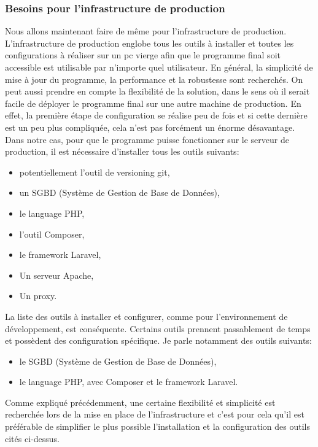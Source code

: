 \documentclass[
    iai, %
    il, %
]{heig-tb}
\begin{document}
\subsubsection{Besoins pour l'infrastructure de production}
Nous allons maintenant faire de même pour l'infrastructure de production.\newline
L'infrastructure de production englobe tous les outils à installer et toutes les configurations à réaliser sur un pc vierge afin que le programme final soit accessible est utilisable par n'importe quel utilisateur.\newline
En général, la simplicité de mise à jour du programme, la performance et la robustesse sont recherchés.\newline
On peut aussi prendre en compte la flexibilité de la solution, dans le sens où il serait facile de déployer le programme final sur une autre machine de production.\newline
En effet, la première étape de configuration se réalise peu de fois et si cette dernière est un peu plus compliquée, cela n'est pas forcément un énorme désavantage.\newline
Dans notre cas, pour que le programme puisse fonctionner sur le serveur de production, il est nécessaire d'installer tous les outils suivants:
\begin{itemize}
    \item potentiellement l'outil de versioning git,
    \item un SGBD (Système de Gestion de Base de Données),
    \item le language PHP,
    \item l'outil Composer,
    \item le framework Laravel,
    \item Un serveur Apache,
    \item Un proxy.
\end{itemize}
La liste des outils à installer et configurer, comme pour l'environnement de développement, est conséquente.\newline
Certains outils prennent passablement de temps et possèdent des configuration spécifique.\newline
Je parle notamment des outils suivants:
\begin{itemize}
    \item le SGBD (Système de Gestion de Base de Données),
    \item le language PHP, avec Composer et le framework Laravel.
\end{itemize}
Comme expliqué précédemment, une certaine flexibilité et simplicité est recherchée lors de la mise en place de l'infrastructure et c'est pour cela qu'il est préférable de simplifier le plus possible l'installation et la configuration des outils cités ci-dessus.
\end{document}
